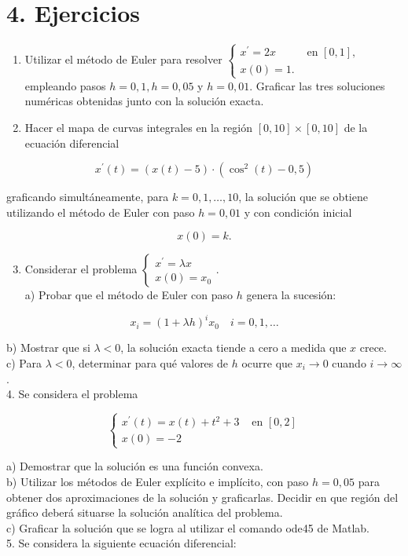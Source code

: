 \documentclass[10pt]{article}
\begin{document}
\section*{4. Ejercicios}
\begin{enumerate}
  \item Utilizar el método de Euler para resolver $\begin{cases}x^{\prime}=2 x & \text { en }[0,1], \\ x(0)=1 . & \end{cases}$ empleando pasos $h=0,1, h=0,05$ y $h=0,01$. Graficar las tres soluciones numéricas obtenidas junto con la solución exacta.
  \item Hacer el mapa de curvas integrales en la región $[0,10] \times[0,10]$ de la ecuación diferencial
\end{enumerate}

$$
x^{\prime}(t)=(x(t)-5) \cdot\left(\cos ^{2}(t)-0,5\right)
$$

graficando simultáneamente, para $k=0,1, \ldots, 10$, la solución que se obtiene utilizando el método de Euler con paso $h=0,01$ y con condición inicial

$$
x(0)=k .
$$

\begin{enumerate}
  \setcounter{enumi}{2}
  \item Considerar el problema $\left\{\begin{array}{l}x^{\prime}=\lambda x \\ x(0)=x_{0}\end{array}\right.$.\\
a) Probar que el método de Euler con paso $h$ genera la sucesión:
\end{enumerate}

$$
x_{i}=(1+\lambda h)^{i} x_{0} \quad i=0,1, \ldots
$$

b) Mostrar que si $\lambda<0$, la solución exacta tiende a cero a medida que $x$ crece.\\
c) Para $\lambda<0$, determinar para qué valores de $h$ ocurre que $x_{i} \rightarrow 0$ cuando $i \rightarrow \infty$.\\
4. Se considera el problema

$$
\begin{cases}x^{\prime}(t)=x(t)+t^{2}+3 & \text { en }[0,2] \\ x(0)=-2 & \end{cases}
$$

a) Demostrar que la solución es una función convexa.\\
b) Utilizar los métodos de Euler explícito e implícito, con paso $h=0,05$ para obtener dos aproximaciones de la solución y graficarlas. Decidir en que región del gráfico deberá situarse la solución analítica del problema.\\
c) Graficar la solución que se logra al utilizar el comando ode45 de Matlab.\\
5. Se considera la siguiente ecuación diferencial:
\end{document}

